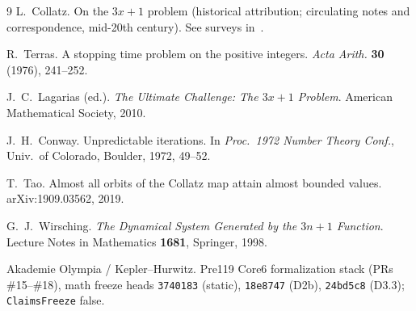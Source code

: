 \documentclass[11pt,a4paper]{article}
\theoremstyle{definition}
\theoremstyle{remark}
\begin{document}
\begin{thebibliography}{9}
L.~Collatz.
\newblock On the $3x+1$ problem (historical attribution; circulating notes and
correspondence, mid-20th century).
\newblock See surveys in~\cite{Lagarias2010}.

R.~Terras.
\newblock A stopping time problem on the positive integers.
\newblock \emph{Acta Arith.} \textbf{30} (1976), 241--252.

J.~C.~Lagarias (ed.).
\newblock \emph{The Ultimate Challenge: The $3x+1$ Problem}.
\newblock American Mathematical Society, 2010.

J.~H.~Conway.
\newblock Unpredictable iterations.
\newblock In \emph{Proc.\ 1972 Number Theory Conf.}, Univ.\ of Colorado,
Boulder, 1972, 49--52.

T.~Tao.
\newblock Almost all orbits of the Collatz map attain almost bounded values.
\newblock arXiv:1909.03562, 2019.

G.~J.~Wirsching.
\newblock \emph{The Dynamical System Generated by the $3n+1$ Function}.
\newblock Lecture Notes in Mathematics \textbf{1681}, Springer, 1998.

Akademie Olympia / Kepler--Hurwitz.
\newblock Pre119 Core6 formalization stack (PRs \#15--\#18),
math freeze heads
\texttt{3740183} (static),
\texttt{18e8747} (D2b),
\texttt{24bd5c8} (D3.3);
\texttt{ClaimsFreeze} false.
\end{thebibliography}
\end{document}
